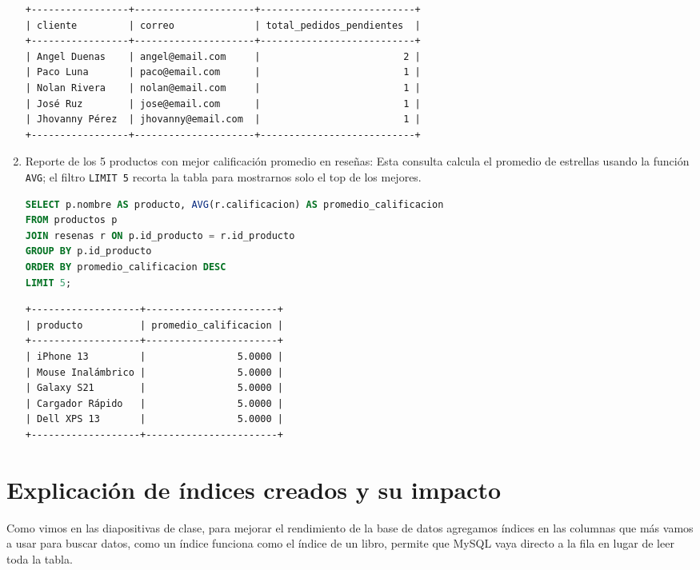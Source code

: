 \documentclass[10pt,letterpaper]{article}
\begin{document}
\begin{enumerate}
    \begin{verbatim}
+-----------------+---------------------+---------------------------+
| cliente         | correo              | total_pedidos_pendientes  |
+-----------------+---------------------+---------------------------+
| Angel Duenas    | angel@email.com     |                         2 |
| Paco Luna       | paco@email.com      |                         1 |
| Nolan Rivera    | nolan@email.com     |                         1 |
| José Ruz        | jose@email.com      |                         1 |
| Jhovanny Pérez  | jhovanny@email.com  |                         1 |
+-----------------+---------------------+---------------------------+
\end{verbatim}

    \item Reporte de los 5 productos con mejor calificaci\'on promedio en rese\~nas:
    Esta consulta calcula el promedio de estrellas usando la funci\'on \texttt{AVG}; el filtro \texttt{LIMIT 5} recorta la tabla para mostrarnos solo el top de los mejores.

    \begin{lstlisting}[language=SQL, frame=single, caption={Consulta de promedio de calificaciones}]
SELECT p.nombre AS producto, AVG(r.calificacion) AS promedio_calificacion
FROM productos p
JOIN resenas r ON p.id_producto = r.id_producto
GROUP BY p.id_producto
ORDER BY promedio_calificacion DESC
LIMIT 5;
    \end{lstlisting}

    \begin{verbatim}
+-------------------+-----------------------+
| producto          | promedio_calificacion |
+-------------------+-----------------------+
| iPhone 13         |                5.0000 |
| Mouse Inalámbrico |                5.0000 |
| Galaxy S21        |                5.0000 |
| Cargador Rápido   |                5.0000 |
| Dell XPS 13       |                5.0000 |
+-------------------+-----------------------+
    \end{verbatim}
\end{enumerate}


\section{Explicaci\'on de \'indices creados y su impacto}
Como vimos en las diapositivas de clase, para mejorar el rendimiento de la base de datos agregamos \'indices en las columnas que m\'as vamos a usar para buscar datos, como un \'indice funciona como el \'indice de un libro, permite que MySQL vaya directo a la fila en lugar de leer toda la tabla.
\end{document}
